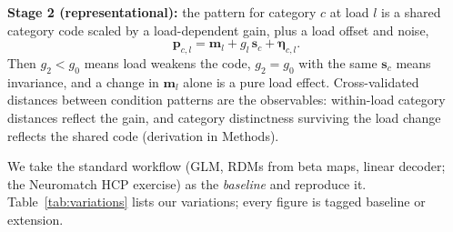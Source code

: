 \documentclass[conference]{IEEEtran}
\begin{document}
\textbf{Stage 2 (representational):} the pattern for category $c$ at load $l$ is a shared category code scaled by a load-dependent gain, plus a load offset and noise,
\begin{equation}
\mathbf{p}_{c,l}=\mathbf{m}_l+g_l\,\mathbf{s}_c+\boldsymbol{\eta}_{c,l}.
\label{eq:rep}
\end{equation}
Then $g_2<g_0$ means load weakens the code, $g_2=g_0$ with the same $\mathbf{s}_c$ means invariance, and a change in $\mathbf{m}_l$ alone is a pure load effect. Cross-validated distances between condition patterns are the observables: within-load category distances reflect the gain, and category distinctness surviving the load change reflects the shared code (derivation in Methods).

We take the standard workflow (GLM, RDMs from beta maps, linear decoder; the Neuromatch HCP exercise) as the \emph{baseline} and reproduce it. Table~\ref{tab:variations} lists our variations; every figure is tagged baseline or extension.
\end{document}
